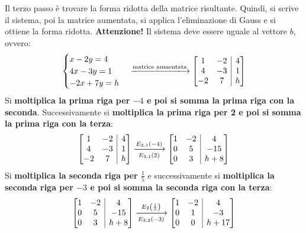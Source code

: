 \documentclass[a4paper]{article}
\makeatletter
\newenvironment{rowequmatbra}[1]{\left[\array{@{}#1@{}}}{\endarray\right]}
\makeatother
\begin{document}
	Il \textcolor{Red3}{terzo passo} è trovare la forma ridotta della matrice risultante. Quindi, si scrive il sistema, poi la matrice aumentata, si applica l'eliminazione di Gauss e si ottiene la forma ridotta.\newline
	\textbf{Attenzione!} Il sistema deve essere uguale al vettore $b$, ovvero:
	\begin{equation*}
		\begin{cases}
			x-2y = 4 	\\
			4x - 3y = 1 \\
			-2x + 7y = h
		\end{cases} \xlongrightarrow{\text{matrice aumentata}}
		\begin{rowequmatbra}{cc|c}
			1		& -2	&  4 \\
			4 		& -3	&  1 \\
			-2		&  7	&  h
		\end{rowequmatbra}
	\end{equation*}
	Si \textbf{moltiplica la prima riga per $-4$ e poi si somma la prima riga con la seconda}. Successivamente si \textbf{moltiplica la prima riga per 2 e poi si somma la prima riga con la terza}:
	\begin{equation*}
		\begin{rowequmatbra}{cc|c}
			1		& -2	&  4 \\
			4 		& -3	&  1 \\
			-2		&  7	&  h			
		\end{rowequmatbra} \xlongrightarrow[E_{3,1}\left(2\right)]{E_{2,1}\left(-4\right)}
		\begin{rowequmatbra}{cc|c}
			1		& -2	&  4 \\
			0 		&  5	&  -15 \\
			0		&  3	&  h+8			
		\end{rowequmatbra}
	\end{equation*}
	Si \textbf{moltiplica la seconda riga per $\frac{1}{5}$} e successivamente si \textbf{moltiplica la seconda riga per $-3$ e poi si somma la seconda riga con la terza}:
	\begin{equation*}
		\begin{rowequmatbra}{cc|c}
			1		& -2	&  4 \\
			0 		&  5	&  -15 \\
			0		&  3	&  h+8			
		\end{rowequmatbra} \xlongrightarrow[E_{3,2}\left(-3\right)]{E_{2}\left(\frac{1}{5}\right)}
		\begin{rowequmatbra}{cc|c}
			1		& -2	&  4 \\
			0 		&  1	&  -3 \\
			0		&  0	&  h + 17			
		\end{rowequmatbra}
	\end{equation*}
\end{document}
